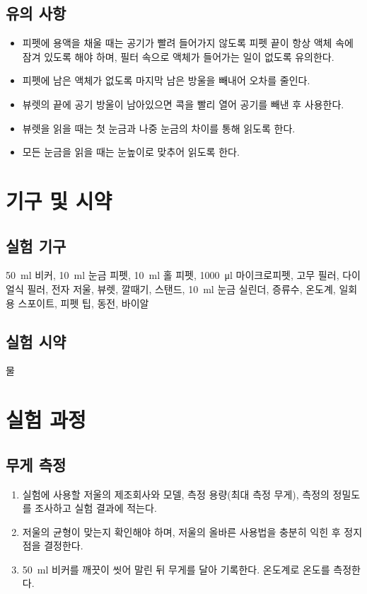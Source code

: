 \documentclass{GSHS-chemexp}
\begin{document}
	\subsection{유의 사항}
	\begin{itemize}
		\item 피펫에 용액을 채울 때는 공기가 빨려 들어가지 않도록
		피펫 끝이 항상 액체 속에 잠겨 있도록 해야 하며,
		필터 속으로 액체가 들어가는 일이 없도록 유의한다.
		\item 피펫에 남은 액체가 없도록 마지막 남은 방울을 빼내어 
		오차를 줄인다.
		\item 뷰렛의 끝에 공기 방울이 남아있으면
		콕을 빨리 열어 공기를 빼낸 후 사용한다.
		\item 뷰렛을 읽을 때는 첫 눈금과 나중 눈금의 차이를 통해
		읽도록 한다.
		\item 모든 눈금을 읽을 때는 눈높이로 맞추어 읽도록 한다.
	\end{itemize}
	
	\section{기구 및 시약}
	
	\subsection{실험 기구}
	\SI{50}{\milli\litre} 비커, \SI{10}{\milli\litre} 눈금 피펫,
	\SI{10}{\milli\litre} 홀 피펫, \SI{1000}{\micro\litre} 마이크로피펫,
	고무 필러, 다이얼식 필러, 전자 저울, 뷰렛, 깔때기, 스탠드,
	\SI{10}{\milli\litre} 눈금 실린더, 증류수, 온도계, 일회용 스포이트,
	피펫 팁, 동전, 바이알
	
	\subsection{실험 시약}
	물
	
	\section{실험 과정}
	
	\subsection{무게 측정}
	\begin{enumerate}
		\item 실험에 사용할 저울의 제조회사와 모델, 측정 용량(최대 측정 무게),
		측정의 정밀도를 조사하고 실험 결과에 적는다.
		\item 저울의 균형이 맞는지 확인해야 하며,
		저울의 올바른 사용법을 충분히 익힌 후 정지점을 결정한다.
		\item \SI{50}{\milli\litre} 비커를 깨끗이 씻어 말린 뒤
		무게를 달아 기록한다. 온도계로 온도를 측정한다.
	\end{enumerate}
	
\end{document}
